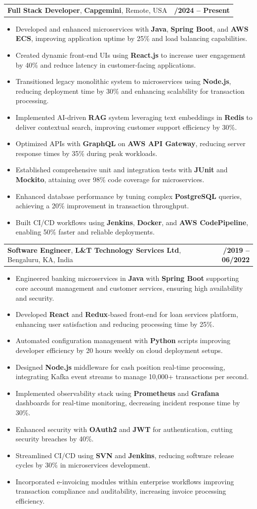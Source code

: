 \documentclass[letterpaper,11pt]{article}
\makeatletter
\newcommand{\resumeItem}[1]{
  \item\footnotesize{
    {#1 \vspace{-2pt}}
  }
}
\newcommand{\resumeSubheading}[4]{
  \vspace{-2pt}\item
    \begin{tabular*}{1.0\textwidth}[t]{l@{\extracolsep{\fill}}r}
      \textbf{\fontsize{10pt}{14pt}\selectfont #3}, \textbf{\fontsize{10pt}{14pt}\selectfont #1}, \fontsize{10pt}{14pt}\selectfont #4 & \textbf{\fontsize{10pt}{14pt}\selectfont #2} \\
    \end{tabular*}\vspace{-7pt}
}
\newcommand{\resumeItemListStart}{\begin{itemize}[leftmargin=*]}
\newcommand{\resumeItemListEnd}{\end{itemize}\vspace{-5pt}}
\makeatother
\begin{document}
    \resumeSubheading
        {Capgemini}{01/2024 -- Present}
        {Full Stack Developer}{Remote, USA}
      \resumeItemListStart
        \resumeItem{Developed and enhanced microservices with \textbf{Java}, \textbf{Spring Boot}, and \textbf{AWS ECS}, improving application uptime by 25\% and load balancing capabilities.}
        \resumeItem{Created dynamic front-end UIs using \textbf{React.js} to increase user engagement by 40\% and reduce latency in customer-facing applications.}
        \resumeItem{Transitioned legacy monolithic system to microservices using \textbf{Node.js}, reducing deployment time by 30\% and enhancing scalability for transaction processing.}
        \resumeItem{Implemented AI-driven \textbf{RAG} system leveraging text embeddings in \textbf{Redis} to deliver contextual search, improving customer support efficiency by 30\%.}
        \resumeItem{Optimized APIs with \textbf{GraphQL} on \textbf{AWS API Gateway}, reducing server response times by 35\% during peak workloads.}
        \resumeItem{Established comprehensive unit and integration tests with \textbf{JUnit} and \textbf{Mockito}, attaining over 98\% code coverage for microservices.}
        \resumeItem{Enhanced database performance by tuning complex \textbf{PostgreSQL} queries, achieving a 20\% improvement in transaction throughput.}
        \resumeItem{Built CI/CD workflows using \textbf{Jenkins}, \textbf{Docker}, and \textbf{AWS CodePipeline}, enabling 50\% faster and reliable deployments.}
      \resumeItemListEnd

    \resumeSubheading
        {L\&T Technology Services Ltd}{08/2019 -- 06/2022}
        {Software Engineer}{Bengaluru, KA, India}
      \resumeItemListStart
        \resumeItem{Engineered banking microservices in \textbf{Java} with \textbf{Spring Boot} supporting core account management and customer services, ensuring high availability and security.}
        \resumeItem{Developed \textbf{React} and \textbf{Redux}-based front-end for loan services platform, enhancing user satisfaction and reducing processing time by 25\%.}
        \resumeItem{Automated configuration management with \textbf{Python} scripts improving developer efficiency by 20 hours weekly on cloud deployment setups.}
        \resumeItem{Designed \textbf{Node.js} middleware for cash position real-time processing, integrating Kafka event streams to manage 10,000+ transactions per second.}
        \resumeItem{Implemented observability stack using \textbf{Prometheus} and \textbf{Grafana} dashboards for real-time monitoring, decreasing incident response time by 30\%.}
        \resumeItem{Enhanced security with \textbf{OAuth2} and \textbf{JWT} for authentication, cutting security breaches by 40\%.}
        \resumeItem{Streamlined CI/CD using \textbf{SVN} and \textbf{Jenkins}, reducing software release cycles by 30\% in microservices development.}
        \resumeItem{Incorporated e-invoicing modules within enterprise workflows improving transaction compliance and auditability, increasing invoice processing efficiency.}
      \resumeItemListEnd
\end{document}
